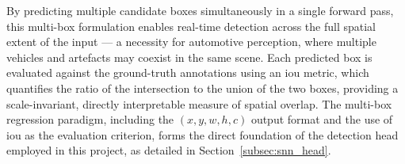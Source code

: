 By predicting multiple candidate boxes simultaneously in a single forward pass, this multi-box formulation enables real-time detection across the full spatial extent of the input ---
a necessity for automotive perception, where multiple vehicles and artefacts may coexist in the same scene.
Each predicted box is evaluated against the ground-truth annotations using an \acrfull{iou} metric, which quantifies the ratio of the intersection to the union of the two boxes, providing a scale-invariant, directly interpretable measure of spatial overlap.
The multi-box regression paradigm, including the $(x, y, w, h, c)$ output format and the use of \gls{iou} as the evaluation criterion, forms the direct foundation of the detection head employed in this project, as detailed in Section~\ref{subsec:snn_head}.

